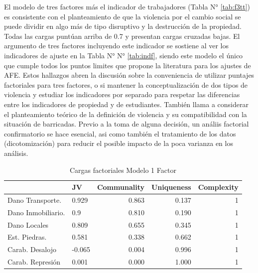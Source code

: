 \documentclass[12pt,twoside]{templates/facsothesis}
\begin{document}
El modelo de tres factores más el indicador de trabajadores (Tabla N° \ref{tab:f3tt}) es consistente con el planteamiento de que la violencia por el cambio social se puede dividir en algo más de tipo disruptivo y la destrucción de la propiedad. Todas las cargas puntúan arriba de 0.7 y presentan cargas cruzadas bajas. El argumento de tres factores incluyendo este indicador se sostiene al ver los indicadores de ajuste en la Tabla N° N° \ref{tab:indf}, siendo este modelo el único que cumple todos los puntos limites que propone la literatura para los ajustes de AFE. Estos hallazgos abren la discusión sobre la conveniencia de utilizar puntajes factoriales para tres factores, o si mantener la conceptualización de dos tipos de violencia y estudiar los indicadores por separado para respetar las diferencias entre los indicadores de propiedad y de estudiantes. También llama a considerar el planteamiento teórico de la definición de violencia y su compatibilidad con la situación de barricadas. Previo a la toma de alguna decisión, un análiis factorial confirmatorio se hace esencial, asi como también el tratamiento de los datos (dicotomización) para reducir el posible impacto de la poca varianza en los análisis.

\begin{table}

\caption{\label{tab:f1t}Cargas factoriales Modelo 1 Factor}
\centering
\begin{tabular}[t]{l|l|r|r|r}
\hline
  & JV & Communality & Uniqueness & Complexity\\
\hline
Dano Transporte. & 0.929 & 0.863 & 0.137 & 1\\
\hline
Dano Inmobiliario. & 0.9 & 0.810 & 0.190 & 1\\
\hline
Dano Locales & 0.809 & 0.655 & 0.345 & 1\\
\hline
Est. Piedras. & 0.581 & 0.338 & 0.662 & 1\\
\hline
Carab. Desalojo & -0.065 & 0.004 & 0.996 & 1\\
\hline
Carab. Represión & 0.001 & 0.000 & 1.000 & 1\\
\hline
\end{tabular}
\end{table}
\end{document}
